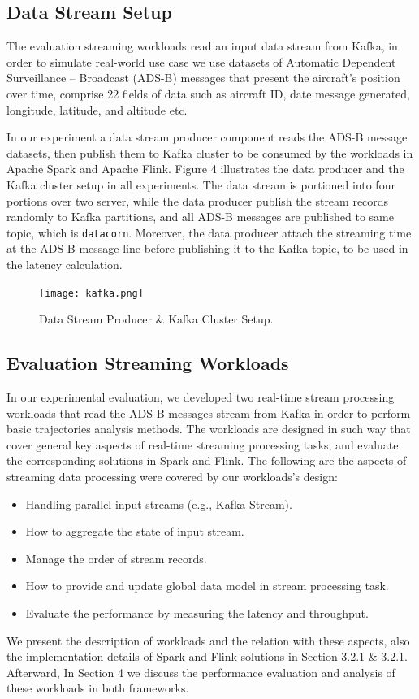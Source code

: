 \documentclass[]{article}
\begin{document}
\subsection{Data Stream Setup}
The evaluation streaming workloads read an input data stream from Kafka, in order to simulate real-world use case we use datasets of Automatic Dependent Surveillance – Broadcast (ADS-B) messages that present the aircraft's position over time, comprise 22 fields of data such as aircraft ID, date message generated, longitude, latitude, and altitude etc.
\par In our experiment a data stream producer component reads the ADS-B message datasets, then publish them to Kafka cluster to be consumed by the workloads in Apache Spark and Apache Flink. Figure 4 illustrates the data producer and the Kafka cluster setup in all experiments.
The data stream is portioned into four portions over two server, while the data producer publish the stream records randomly to Kafka partitions, and all ADS-B messages are published to same topic, which is \texttt{datacorn}. Moreover, the data producer attach the streaming time at the ADS-B message line before publishing it to the Kafka topic, to be used in the latency calculation.

\begin{figure}[h]
 
  \centering
    \texttt{[image: kafka.png]}
     \caption{Data Stream Producer \& Kafka Cluster Setup.}
\end{figure} 

\subsection{Evaluation Streaming Workloads}
In our experimental evaluation, we developed two real-time stream processing workloads that read the ADS-B messages stream from Kafka in order to perform basic trajectories analysis methods. The workloads are designed in such way that cover general key aspects of real-time streaming processing tasks, and evaluate the corresponding solutions in Spark and Flink. The following are the aspects of streaming data processing were covered by our workloads's design: 

\begin{itemize}
\item Handling parallel input streams (e.g., Kafka Stream).
\item How to aggregate the state of input stream.
\item Manage the order of stream records.
\item How to provide and update global data model in stream processing task.
\item Evaluate the performance by measuring  the latency and throughput.
\end{itemize}
We present the description of workloads and the relation with these aspects, also the implementation details of Spark and Flink solutions in Section 3.2.1 \& 3.2.1. Afterward, In Section 4 we discuss the performance evaluation and analysis of these workloads in both frameworks.
\end{document}
